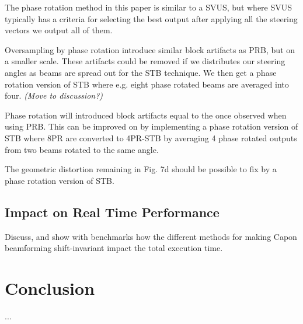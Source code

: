 \documentclass[journal]{IEEEtran}
\newcommand\comment[1]{\textit{{\color{red}(#1)}}}
\begin{document}
The phase rotation method in this paper is similar to a SVUS, but where SVUS typically has a criteria for selecting the best output after applying all the steering vectors we output all of them.

Oversampling by phase rotation introduce similar block artifacts as PRB, but on a smaller scale. These artifacts could be removed if we distributes our steering angles as beams are spread out for the STB technique. We then get a phase rotation version of STB where e.g. eight phase rotated beams are averaged into four. \comment{Move to discussion?}

Phase rotation will introduced block artifacts equal to the once observed when using PRB. This can be improved on by implementing a phase rotation version of STB where 8PR are converted to 4PR-STB by averaging 4 phase rotated outputs from two beams rotated to the same angle. 

The geometric distortion remaining in Fig. 7d should be possible to fix by a phase rotation version of STB.

\subsection{Impact on Real Time Performance}
Discuss, and show with benchmarks how the different methods for making Capon beamforming shift-invariant impact the total execution time.

\section{Conclusion}\label{sec:con}
...


%
%
\end{document}
